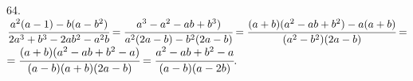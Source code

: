 64. $\cfrac{a^2(a-1)-b(a-b^2)}{2a^3+b^3-2ab^2-a^2b}=\cfrac{a^3-a^2-ab+b^3)}{a^2(2a-b)-b^2(2a-b)}=
\cfrac{(a+b)(a^2-ab+b^2)-a(a+b)}{(a^2-b^2)(2a-b)}=$\\$=\cfrac{(a+b)(a^2-ab+b^2-a)}{(a-b)(a+b)(2a-b)}=\cfrac{a^2-ab+b^2-a}{(a-b)(a-2b)}.$\\
